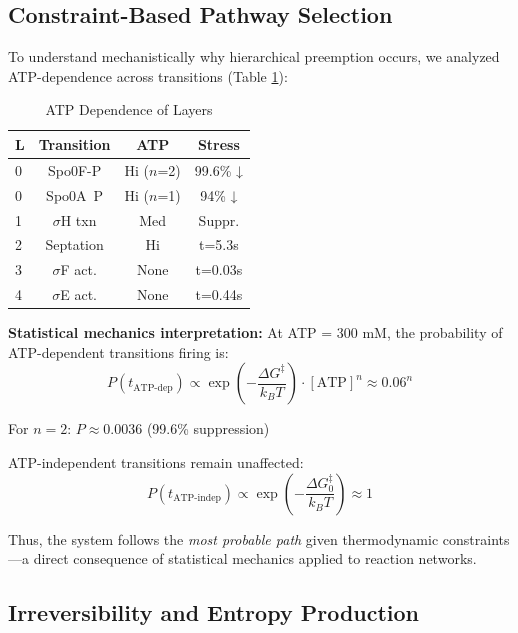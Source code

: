 \documentclass[twocolumn,11pt]{article}
\begin{document}
\subsection{Constraint-Based Pathway Selection}

To understand mechanistically why hierarchical preemption occurs, we analyzed ATP-dependence across transitions (Table \ref{tab:atp_dependence}):

\begin{table}[h]
\centering
\small
\caption{ATP Dependence of Layers}
\label{tab:atp_dependence}
\begin{tabular}{@{}lccc@{}}
\toprule
\textbf{L} & \textbf{Transition} & \textbf{ATP} & \textbf{Stress} \\
\midrule
0 & Spo0F-P & Hi ($n$=2) & 99.6\% ↓ \\
0 & Spo0A~P & Hi ($n$=1) & 94\% ↓ \\
1 & $\sigma$H txn & Med & Suppr. \\
2 & Septation & Hi & t=5.3s \\
3 & $\sigma$F act. & None & t=0.03s \\
4 & $\sigma$E act. & None & t=0.44s \\
\bottomrule
\end{tabular}
\end{table}

\textbf{Statistical mechanics interpretation:} At ATP = 300 mM, the probability of ATP-dependent transitions firing is:
\begin{equation}
    P(t_{\text{ATP-dep}}) \propto \exp\left(-\frac{\Delta G^\ddagger}{k_B T}\right) \cdot [\text{ATP}]^n \approx 0.06^n
\end{equation}

For $n=2$: $P \approx 0.0036$ (99.6\% suppression)

ATP-independent transitions remain unaffected:
\begin{equation}
    P(t_{\text{ATP-indep}}) \propto \exp\left(-\frac{\Delta G_0^\ddagger}{k_B T}\right) \approx 1
\end{equation}

Thus, the system follows the \textit{most probable path} given thermodynamic constraints—a direct consequence of statistical mechanics applied to reaction networks.

\subsection{Irreversibility and Entropy Production}
\end{document}
